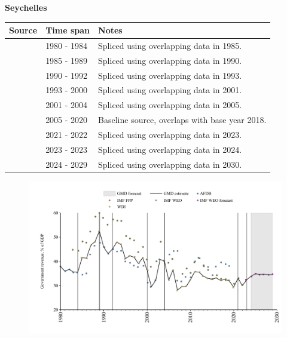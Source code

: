 \documentclass[12pt,a4paper,landscape]{article}
\begin{document}
\begin{adjustbox}{max totalsize={\paperwidth}{\paperheight},center}
\begin{minipage}[t][\textheight][t]{\textwidth}
\vspace*{0.5cm}
{}
\begin{center}
{\Large\bfseries Seychelles}
\end{center}
\vspace{0.5cm}
\begin{table}[H]
\centering
\small
\begin{tabular}{|l|l|l|}
\hline
\textbf{Source} & \textbf{Time span} & \textbf{Notes} \\
\hline
\rowcolor{white}\cite{AFDB}& 1980 - 1984 &Spliced using overlapping data in 1985.\\
\rowcolor{lightgray}\cite{WDI}& 1985 - 1989 &Spliced using overlapping data in 1990.\\
\rowcolor{white}\cite{AFDB}& 1990 - 1992 &Spliced using overlapping data in 1993.\\
\rowcolor{lightgray}\cite{WDI}& 1993 - 2000 &Spliced using overlapping data in 2001.\\
\rowcolor{white}\cite{AFDB}& 2001 - 2004 &Spliced using overlapping data in 2005.\\
\rowcolor{lightgray}\cite{WDI}& 2005 - 2020 &Baseline source, overlaps with base year 2018.\\
\rowcolor{white}\cite{IMF_WEO}& 2021 - 2022 &Spliced using overlapping data in 2023.\\
\rowcolor{lightgray}\cite{IMF_FPP}& 2023 - 2023 &Spliced using overlapping data in 2024.\\
\rowcolor{white}\cite{IMF_WEO_forecast}& 2024 - 2029 &Spliced using overlapping data in 2030.\\
\hline
\end{tabular}
\end{table}
\begin{figure}[H]
\centering
\includegraphics[width=\textwidth,height=0.6\textheight,keepaspectratio]{graphs/SYC_govrev_GDP.pdf}
\end{figure}
\end{minipage}
\end{adjustbox}
\end{document}
